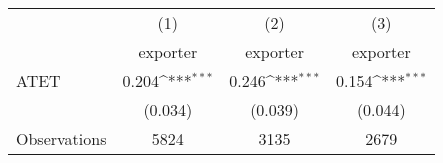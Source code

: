 {
\def\sym#1{\ifmmode^{#1}\else\(^{#1}\)\fi}
\begin{tabular}{l*{3}{c}}
\hline\hline
                    &\multicolumn{1}{c}{(1)}&\multicolumn{1}{c}{(2)}&\multicolumn{1}{c}{(3)}\\
                    &\multicolumn{1}{c}{exporter}&\multicolumn{1}{c}{exporter}&\multicolumn{1}{c}{exporter}\\
\hline
ATET                &       0.204\sym{***}&       0.246\sym{***}&       0.154\sym{***}\\
                    &     (0.034)         &     (0.039)         &     (0.044)         \\
\hline
Observations        &        5824         &        3135         &        2679         \\
\hline\hline
\end{tabular}
}

